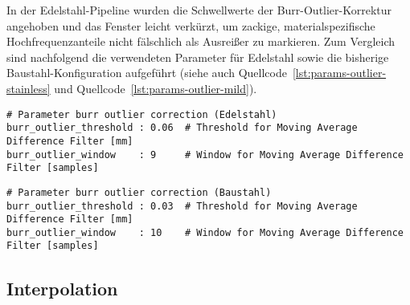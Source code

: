 In der Edelstahl-Pipeline wurden die Schwellwerte der Burr-Outlier-Korrektur angehoben und das Fenster leicht verkürzt, um zackige, materialspezifische Hochfrequenzanteile nicht fälschlich als Ausreißer zu markieren. Zum Vergleich sind nachfolgend die verwendeten Parameter für Edelstahl sowie die bisherige Baustahl-Konfiguration aufgeführt (siehe auch Quellcode~\ref{lst:params-outlier-stainless} und Quellcode~\ref{lst:params-outlier-mild}).

\begin{lstlisting}[caption={Pipeline-Parameter Outlier Correction (Edelstahl)}, label={lst:params-outlier-stainless}]
# Parameter burr outlier correction (Edelstahl)
burr_outlier_threshold : 0.06  # Threshold for Moving Average Difference Filter [mm]
burr_outlier_window    : 9     # Window for Moving Average Difference Filter [samples]
\end{lstlisting}

\begin{lstlisting}[caption={Pipeline-Parameter Outlier Correction (Baustahl)}, label={lst:params-outlier-mild}]
# Parameter burr outlier correction (Baustahl)
burr_outlier_threshold : 0.03  # Threshold for Moving Average Difference Filter [mm]
burr_outlier_window    : 10    # Window for Moving Average Difference Filter [samples]
\end{lstlisting}

\subsection {Interpolation}